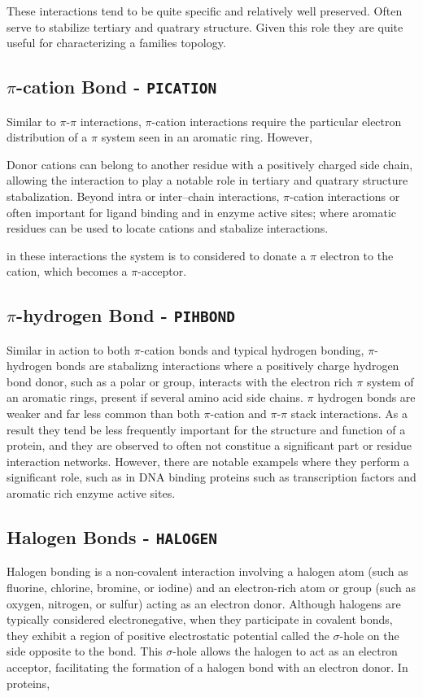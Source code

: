 These interactions tend to be quite specific and relatively well preserved.
Often serve to stabilize tertiary and quatrary structure. Given this role they are quite useful for characterizing a families topology.

\subsection{$\pi$-cation Bond - \texttt{PICATION}} 
Similar to $\pi$-$\pi$ interactions, $\pi$-cation interactions require the particular electron distribution of a $\pi$ system seen in an aromatic ring. However,

Donor cations can belong to another residue with a positively charged side chain, allowing the interaction to play a notable role in tertiary and quatrary structure stabalization.
Beyond intra or inter--chain interactions, $\pi$-cation interactions or often important for ligand binding and in enzyme active sites; where aromatic residues can be used to locate cations and stabalize interactions.

in these interactions the system is to considered to donate a $\pi$ electron to the cation, which becomes a $\pi$-acceptor.

\subsection{$\pi$-hydrogen Bond - \texttt{PIHBOND}}
Similar in action to both $\pi$-cation bonds and typical hydrogen bonding, $\pi$-hydrogen bonds are stabalizng interactions where a positively charge hydrogen bond donor, such as a polar  or  group, interacts with the electron rich $\pi$ system of an aromatic rings, present if several amino acid side chains.
$\pi$ hydrogen bonds are weaker and far less common than both $\pi$-cation and $\pi$-$\pi$ stack interactions. As a result they tend be less frequently important for the structure and function of a protein, and they are observed to often not constitue a significant part or residue interaction networks. However, there are notable exampels where they perform a significant role, such as in DNA binding proteins such as transcription factors and aromatic rich enzyme active sites. 

\subsection{Halogen Bonds - \texttt{HALOGEN}}
Halogen bonding is a non-covalent interaction involving a halogen atom (such as fluorine, chlorine, bromine, or iodine) and an electron-rich atom or group (such as oxygen, nitrogen, or sulfur) acting as an electron donor. Although halogens are typically considered electronegative, when they participate in covalent bonds, they exhibit a region of positive electrostatic potential called the $\sigma$-hole on the side opposite to the bond. This $\sigma$-hole allows the halogen to act as an electron acceptor, facilitating the formation of a halogen bond with an electron donor. 
In proteins, 

